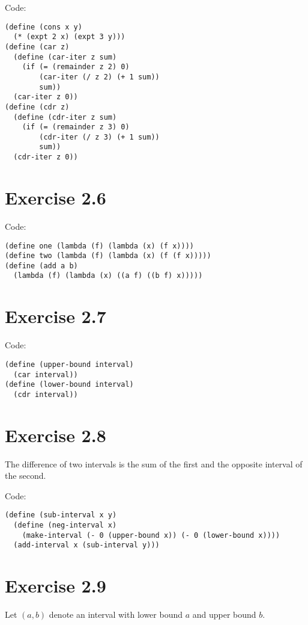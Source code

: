 \documentclass[../main.tex]{subfiles}
\begin{document}
Code:

\begin{lstlisting}
(define (cons x y)
  (* (expt 2 x) (expt 3 y)))
(define (car z)
  (define (car-iter z sum)
    (if (= (remainder z 2) 0)
        (car-iter (/ z 2) (+ 1 sum))
        sum))
  (car-iter z 0))
(define (cdr z)
  (define (cdr-iter z sum)
    (if (= (remainder z 3) 0)
        (cdr-iter (/ z 3) (+ 1 sum))
        sum))
  (cdr-iter z 0))
\end{lstlisting}

\section{Exercise 2.6}

Code:

\begin{lstlisting}
(define one (lambda (f) (lambda (x) (f x))))
(define two (lambda (f) (lambda (x) (f (f x)))))
(define (add a b)
  (lambda (f) (lambda (x) ((a f) ((b f) x)))))
\end{lstlisting}

\section{Exercise 2.7}

Code:

\begin{lstlisting}
(define (upper-bound interval)
  (car interval))
(define (lower-bound interval)
  (cdr interval))
\end{lstlisting}

\section{Exercise 2.8}

The difference of two intervals is the
 sum of the first and the opposite interval
 of the second.

Code:

\begin{lstlisting}
(define (sub-interval x y)
  (define (neg-interval x)
    (make-interval (- 0 (upper-bound x)) (- 0 (lower-bound x))))
  (add-interval x (sub-interval y)))
\end{lstlisting}

\section{Exercise 2.9}

Let $(a, b)$ denote an interval with
 lower bound $a$ and upper bound $b$.
\end{document}
